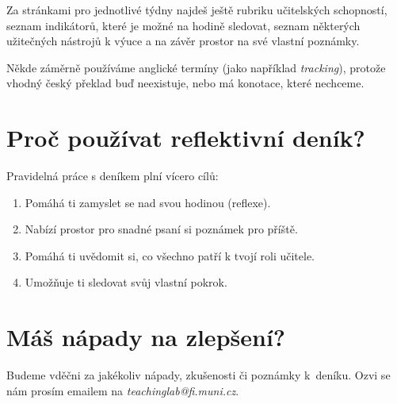 Za stránkami pro jednotlivé týdny najdeš ještě rubriku učitelských schopností, seznam indikátorů, které je možné na hodině sledovat, seznam některých užitečných nástrojů k výuce a na závěr prostor na své vlastní poznámky.

Někde záměrně používáme anglické termíny (jako například \textit{tracking}), protože vhodný český překlad buď neexistuje, nebo má konotace, které nechceme.

\section*{Proč používat reflektivní deník?}

Pravidelná práce s deníkem plní vícero cílů:
\begin{enumerate}[topsep=0pt]
\item Pomáhá ti zamyslet se nad svou hodinou (reflexe).
\item Nabízí prostor pro snadné psaní si poznámek pro příště.
\item Pomáhá ti uvědomit si, co všechno patří k tvojí roli učitele.
\item Umožňuje ti sledovat svůj vlastní pokrok.
\end{enumerate}

\section*{Máš nápady na zlepšení?}

Budeme vděčni za jakékoliv nápady, zkušenosti či poznámky k~deníku. Ozvi se nám prosím emailem na \textit{teachinglab@fi.muni.cz}.
